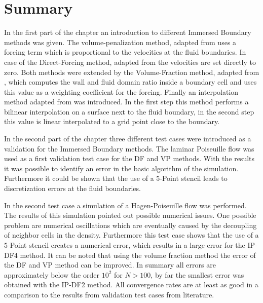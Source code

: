 


\clearpage

\section{Summary}

In the first part of the chapter an introduction to different Immersed Boundary methods was given.
The volume-penalization method, adapted from  \citep{Lulff2011} uses a forcing term which is proportional to the velocities at the fluid boundaries.
In case of the Direct-Forcing method, adapted from \citep{Fadlun2000} the velocities are set directly to zero.
Both methods were extended by the Volume-Fraction method, adapted from \citep{Fadlun2000}, which computes the wall and fluid domain ratio inside a boundary
cell and uses this value as a weighting coefficient for the forcing.
Finally an interpolation method adapted from  \citep{ Gilmanov2003} was introduced. In the first step this method performs a bilinear interpolation on a surface
next to the fluid boundary, in the second step this value is linear interpolated to a grid point close to the boundary.

In the second part of the chapter three different test cases were introduced as a validation for the Immersed Boundary methods.
The laminar Poiseuille flow was used as a first validation test case for the DF and VP methods.
With the results it was possible to identify an error in the basic algorithm of the simulation.
Furthermore it could be shown that the use of a 5-Point stencil leads to discretization errors at the fluid boundaries.

In the second test case a simulation of a Hagen-Poiseuille flow was performed.
The results of this simulation pointed out possible numerical issues.
One possible problem are numerical oscillations which are eventually caused
by the decoupling of neighbor cells in the density.
Furthermore this test case shows that the use of a 5-Point stencil creates a numerical error,
which results in a large error for the IP-DF4 method.
It can be noted that using the volume fraction method  the error of the DF and VP method can be improved.
In summary all errors are approximately below the order  $10^2$ for $N>100$,
by far the smallest error was obtained with the IP-DF2 method.
All convergence rates are at least as good in a comparison
to the results from validation test cases from literature.


